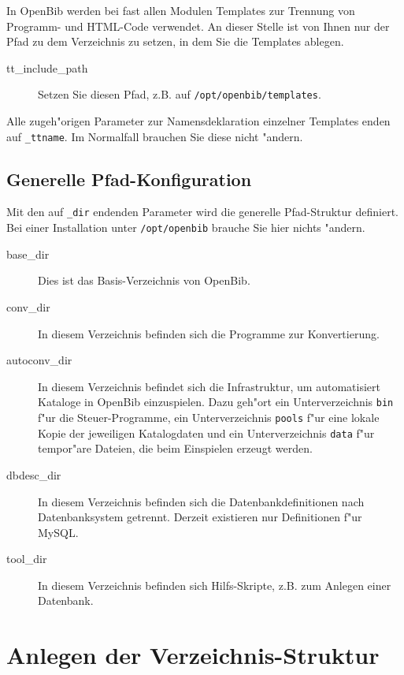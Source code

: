 \documentclass[11pt, twoside, a4paper, BCOR8mm, DIV12, bibtotoc,idxtotoc]{scrbook}
\begin{document}
In OpenBib werden bei fast allen Modulen Templates zur Trennung von
Programm- und HTML-Code verwendet. An dieser Stelle ist von Ihnen nur
der Pfad zu dem Verzeichnis zu setzen, in dem Sie die Templates
ablegen.

\begin{description}
\item[tt\_include\_path] Setzen Sie diesen Pfad, z.B. auf
  \texttt{/opt/openbib/templates}.
\end{description}

Alle zugeh"origen Parameter zur Namensdeklaration einzelner Templates
enden auf \texttt{\_ttname}. Im Normalfall brauchen Sie diese nicht
"andern.


\subsection{Generelle Pfad-Konfiguration}

Mit den auf \texttt{\_dir} endenden Parameter wird die generelle
Pfad-Struktur definiert. Bei einer Installation unter
\texttt{/opt/openbib} brauche Sie hier nichts "andern.

\begin{description}
\item[base\_dir] Dies ist das Basis-Verzeichnis von OpenBib.
\item[conv\_dir] In diesem Verzeichnis befinden sich die Programme zur
  Konvertierung.
\item[autoconv\_dir] In diesem Verzeichnis befindet sich die
  Infrastruktur, um automatisiert Kataloge in OpenBib
  einzuspielen. Dazu geh"ort ein Unterverzeichnis \texttt{bin} f"ur
  die Steuer-Programme, ein Unterverzeichnis \texttt{pools} f"ur eine
  lokale Kopie der jeweiligen Katalogdaten und ein Unterverzeichnis
  \texttt{data} f"ur tempor"are Dateien, die beim Einspielen erzeugt
  werden.
\item[dbdesc\_dir] In diesem Verzeichnis befinden sich die
  Datenbankdefinitionen nach Datenbanksystem getrennt. Derzeit
  existieren nur Definitionen f"ur MySQL.
\item[tool\_dir] In diesem Verzeichnis befinden sich Hilfs-Skripte,
  z.B. zum Anlegen einer Datenbank.
\end{description}


\section{Anlegen der Verzeichnis-Struktur}
\end{document}
